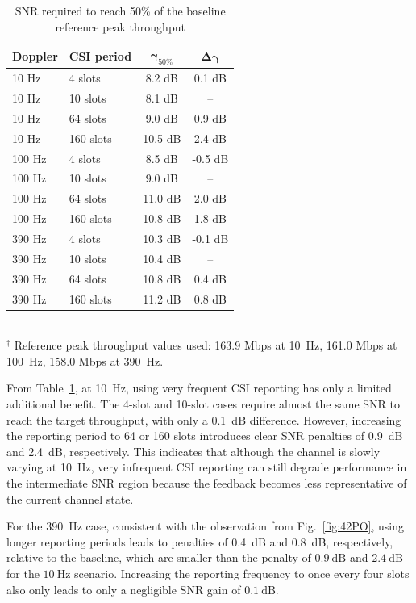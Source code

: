 \documentclass[a4paper,12pt,onecolumn]{article}
\begin{document}
		
		\begin{table}[H]
			\centering
			\caption{SNR required to reach 50\% of the baseline reference peak throughput}
			\label{tab:csi_period_snr_required}
			\begin{tabular}{llcc}
				\midrule
				\textbf{Doppler} & \textbf{CSI period} & \(\boldsymbol{\gamma}_{50\%}\) & \(\boldsymbol{\Delta\gamma}\) \\
				\toprule
				10 Hz  & 4 slots   & 8.2 dB & 0.1 dB \\
				10 Hz  & 10 slots  & 8.1 dB & -- \\
				10 Hz  & 64 slots  & 9.0 dB & 0.9 dB \\
				10 Hz  & 160 slots & 10.5 dB & 2.4 dB \\
				\midrule
				100 Hz & 4 slots   & 8.5 dB & -0.5 dB \\
				100 Hz & 10 slots  & 9.0 dB & -- \\
				100 Hz & 64 slots  & 11.0 dB & 2.0 dB \\
				100 Hz & 160 slots & 10.8 dB & 1.8 dB \\
				\midrule
				390 Hz & 4 slots   & 10.3 dB & -0.1 dB \\
				390 Hz & 10 slots  & 10.4 dB & -- \\
				390 Hz & 64 slots  & 10.8 dB & 0.4 dB \\
				390 Hz & 160 slots & 11.2 dB & 0.8 dB \\
				\bottomrule
			\end{tabular} \\
			$^\dagger$ Reference peak throughput values used: 
			163.9 Mbps at 10~Hz, 161.0 Mbps at 100~Hz, 158.0 Mbps at 390~Hz.
			
		\end{table}
		
		\newpage
			From Table~\ref{tab:csi_period_snr_required}, at 10~Hz, using very frequent CSI reporting has only a limited additional benefit. The 4-slot and 10-slot cases require almost the same SNR to reach the target throughput, with only a 0.1~dB difference. However, increasing the reporting period to 64 or 160 slots introduces clear SNR penalties of 0.9~dB and 2.4~dB, respectively. This indicates that although the channel is slowly varying at 10~Hz, very infrequent CSI reporting can still degrade performance in the intermediate SNR region because the feedback becomes less representative of the current channel state.
		
			For the 390~Hz case, consistent with the observation from Fig.~\ref{fig:42PO}, using longer reporting periods leads to penalties of  0.4~dB and 0.8~dB, respectively, relative to the baseline, which are smaller than the penalty of \(0.9~\mathrm{dB}\) and \(2.4~\mathrm{dB}\) for the \(10~\mathrm{Hz}\) scenario. Increasing the reporting frequency to once every four slots also only leads to only a negligible SNR
			gain of \(0.1~\mathrm{dB}\).
				
\end{document}
